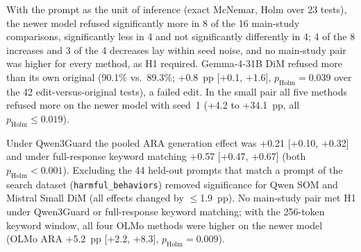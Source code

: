 With the prompt as the unit of inference (exact McNemar, Holm over 23 tests),
the newer model refused significantly more in 8 of the 16 main-study
comparisons, significantly less in 4 and not significantly differently in 4;
4 of the 8 increases and 3 of the 4 decreases lay within seed noise, and no
main-study pair was higher for every method, as H1 required. Gemma-4-31B
DiM refused more than its own original (90.1\% vs.\ 89.3\%; +0.8~pp [+0.1,
+1.6], $p_\mathrm{Holm}=0.039$ over the 42 edit-versus-original tests), a
failed edit. In the small pair all five methods refused more on the newer
model with seed~1 (+4.2 to +34.1~pp, all $p_\mathrm{Holm}\le 0.019$).




Under Qwen3Guard the pooled ARA generation effect was +0.21
[+0.10, +0.32] and under full-response keyword matching +0.57 [+0.47, +0.67]
(both $p_\mathrm{Holm}<0.001$). Excluding the 44 held-out prompts that match a prompt of the
search dataset (\texttt{harmful\_behaviors}) removed significance for Qwen SOM
and Mistral Small DiM (all effects changed by $\le$1.9~pp). No main-study pair
met H1 under Qwen3Guard or full-response keyword matching; with the 256-token
keyword window, all four OLMo methods were higher on the newer model (OLMo ARA
+5.2~pp [+2.2, +8.3], $p_\mathrm{Holm}=0.009$).

